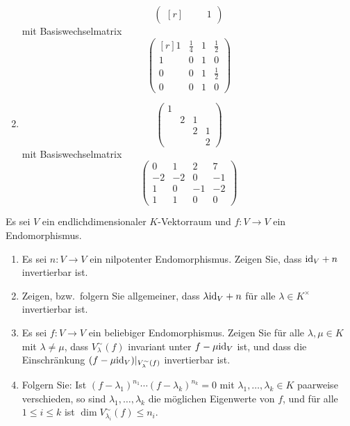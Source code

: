 \documentclass[a4paper,10pt]{scrartcl}
\begin{document}
\begin{solution}
\begin{enumerate}
\[\begin{pmatrix*}[r]
              &     &   & 1
        \end{pmatrix*}
      \]
      mit Basiswechselmatrix
      \[
        \begin{pmatrix*}[r]
          1 & \frac{1}{4} & 1 & \frac{1}{2} \\
          1 & 0           & 1 & 0           \\
          0 & 0           & 1 & \frac{1}{2} \\
          0 & 0           & 1 & 0
        \end{pmatrix*}
      \]
    \item
      \[
        \begin{pmatrix}
          1 &   &   &   \\
            & 2 & 1 &   \\
            &   & 2 & 1 \\
            &   &   & 2
        \end{pmatrix}
      \]
      mit Basiswechselmatrix
      \[
        \begin{pmatrix}
           0  &  1  &  2  &  7  \\
          -2  & -2  &  0  & -1  \\
           1  &  0  & -1  & -2  \\
           1  &  1  &  0  &  0
        \end{pmatrix}
      \]
  \end{enumerate}
\end{solution}


\begin{question}
  Es sei $V$ ein endlichdimensionaler $K$-Vektorraum und $f \colon V \to V$ ein Endomorphismus.
  \begin{enumerate}[leftmargin=*]
    \item
      Es sei $n \colon V \to V$ ein nilpotenter Endomorphismus.
      Zeigen Sie, dass ${\operatorname{id}_V} + n$ invertierbar ist.
    \item
      Zeigen, bzw.\ folgern Sie allgemeiner, dass $\lambda {\operatorname{id}_V} + n$ für alle $\lambda \in K^\times$ invertierbar ist.
    \item
      Es sei $f \colon V \to V$ ein beliebiger Endomorphismus.
      Zeigen Sie für alle $\lambda, \mu \in K$ mit $\lambda \neq \mu$, dass $V^\sim_\lambda(f)$ invariant unter $f - \mu {\operatorname{id}_V}$ ist, und dass die Einschränkung $(f - \mu {\operatorname{id}_V})|_{V^\sim_\lambda(f)}$ invertierbar ist.
    \item
      Folgern Sie:
      Ist $(f - \lambda_1)^{n_1} \dotsm (f - \lambda_k)^{n_k} = 0$ mit $\lambda_1, \dotsc, \lambda_k \in K$ paarweise verschieden, so sind $\lambda_1, \dotsc, \lambda_k$ die möglichen Eigenwerte von $f$, und für alle $1 \leq i \leq k$ ist $\dim V^\sim_{\lambda_i}(f) \leq n_i$.
  \end{enumerate}
\end{question}
\end{document}

